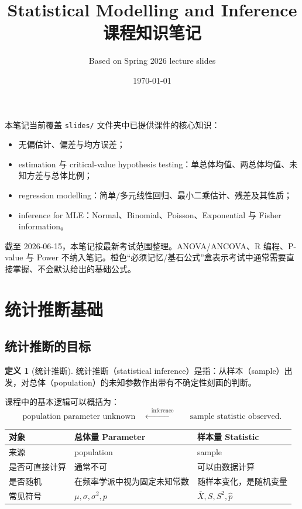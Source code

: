 \documentclass[11pt,a4paper]{article}
\title{\textbf{Statistical Modelling and Inference\\课程知识笔记}}
\author{Based on Spring 2026 lecture slides}
\date{\today}
\theoremstyle{definition}
\newtheorem{definition}{定义}[section]
\theoremstyle{plain}
\theoremstyle{remark}
\begin{document}
\maketitle
\tableofcontents
\newpage

\begin{sourcebox}[当前版本说明]
本笔记当前覆盖 \texttt{slides/} 文件夹中已提供课件的核心知识：
\begin{itemize}
    \item 无偏估计、偏差与均方误差；
    \item estimation 与 critical-value hypothesis testing：单总体均值、两总体均值、未知方差与总体比例；
    \item regression modelling：简单/多元线性回归、最小二乘估计、残差及其性质；
    \item inference for MLE：Normal、Binomial、Poisson、Exponential 与 Fisher information。
\end{itemize}
截至 2026-06-15，本笔记按最新考试范围整理。ANOVA/ANCOVA、R 编程、P-value 与 Power 不纳入笔记。橙色“必须记忆/基石公式”盒表示考试中通常需要直接掌握、不会默认给出的基础公式。
\end{sourcebox}

\section{统计推断基础}
\label{sec:foundations}

\subsection{统计推断的目标}

\begin{definition}[统计推断]
统计推断（statistical inference）是指：从样本（sample）出发，对总体（population）的未知参数作出带有不确定性刻画的判断。
\end{definition}

课程中的基本逻辑可以概括为：
\[
\text{population parameter unknown}
\quad \xleftarrow{\quad \text{inference} \quad}
\quad \text{sample statistic observed}.
\]

\begin{keybox}
\begin{center}
\begin{tabular}{lll}
\toprule
对象 & 总体量 Parameter & 样本量 Statistic\\
\midrule
来源 & population & sample\\
是否可直接计算 & 通常不可 & 可以由数据计算\\
是否随机 & 在频率学派中视为固定未知常数 & 随样本变化，是随机变量\\
常见符号 & $\mu,\sigma,\sigma^2,p$ & $\bar X,S,S^2,\hat p$\\
\bottomrule
\end{tabular}
\end{center}
\end{keybox}
\end{document}
